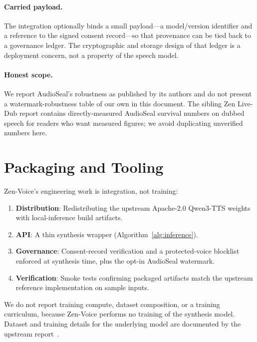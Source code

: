 \documentclass[11pt,a4paper]{article}
\begin{document}
\paragraph{Carried payload.} The integration optionally binds a small payload---a
model/version identifier and a reference to the signed consent record---so that
provenance can be tied back to a governance ledger. The cryptographic and storage
design of that ledger is a deployment concern, not a property of the speech model.

\paragraph{Honest scope.} We report AudioSeal's robustness as published by its authors
and do not present a watermark-robustness table of our own in this document. The sibling
Zen Live-Dub report contains directly-measured AudioSeal survival numbers on dubbed
speech for readers who want measured figures; we avoid duplicating unverified numbers
here.

\section{Packaging and Tooling}
\label{sec:training}

Zen-Voice's engineering work is integration, not training:
\begin{enumerate}
    \item \textbf{Distribution}: Redistributing the upstream Apache-2.0 Qwen3-TTS
          weights with local-inference build artifacts.
    \item \textbf{API}: A thin synthesis wrapper (Algorithm~\ref{alg:inference}).
    \item \textbf{Governance}: Consent-record verification and a protected-voice
          blocklist enforced at synthesis time, plus the opt-in AudioSeal watermark.
    \item \textbf{Verification}: Smoke tests confirming packaged artifacts match the
          upstream reference implementation on sample inputs.
\end{enumerate}

We do not report training compute, dataset composition, or a training curriculum,
because Zen-Voice performs no training of the synthesis model. Dataset and training
details for the underlying model are documented by the upstream
report~\citep{qwen3tts}.
\end{document}
